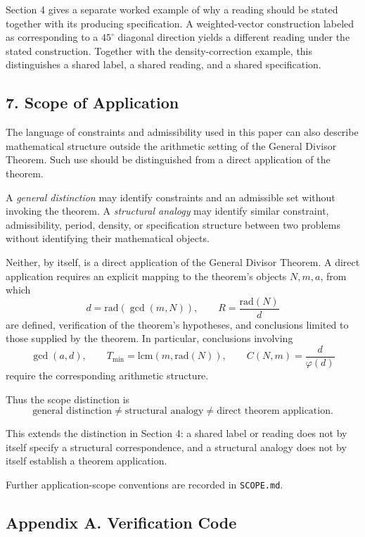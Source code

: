\documentclass[
]{article}
\begin{document}
Section 4 gives a separate worked example of why a reading should be
stated together with its producing specification. A weighted-vector
construction labeled as corresponding to a \(45^\circ\) diagonal direction
yields a different reading under the stated construction. Together with
the density-correction example, this distinguishes a shared label, a
shared reading, and a shared specification.


\subsection{7. Scope of Application}\label{scope-of-application}

The language of constraints and admissibility used in this paper can
also describe mathematical structure outside the arithmetic setting of
the General Divisor Theorem. Such use should be distinguished from a
direct application of the theorem.

A \emph{general distinction} may identify constraints and an admissible
set without invoking the theorem. A \emph{structural analogy} may
identify similar constraint, admissibility, period, density, or
specification structure between two problems without identifying their
mathematical objects.

Neither, by itself, is a direct application of the General Divisor
Theorem. A direct application requires an explicit mapping to the
theorem's objects \(N,m,a\), from which
\[
d=\mathrm{rad}(\gcd(m,N)), \qquad
R=\frac{\mathrm{rad}(N)}{d}
\]
are defined, verification of the theorem's hypotheses, and conclusions
limited to those supplied by the theorem. In particular, conclusions
involving
\[
\gcd(a,d),\qquad
T_{\min}=\mathrm{lcm}(m,\mathrm{rad}(N)),\qquad
C(N,m)=\frac{d}{\varphi(d)}
\]
require the corresponding arithmetic structure.

Thus the scope distinction is
\[
\boxed{
\text{general distinction}
\ne
\text{structural analogy}
\ne
\text{direct theorem application}.
}
\]

This extends the distinction in Section 4: a shared label or reading
does not by itself specify a structural correspondence, and a structural
analogy does not by itself establish a theorem application.

Further application-scope conventions are recorded in
\texttt{SCOPE.md}.

\subsection{Appendix A. Verification
Code}\label{appendix-a.-verification-code}
\end{document}
